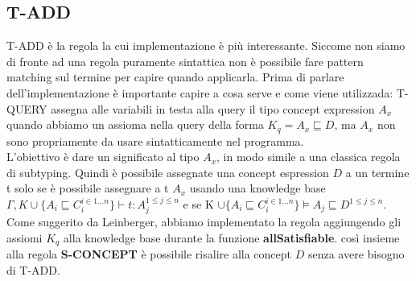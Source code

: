             \subsection{T-ADD}
            T-ADD è la regola la cui implementazione è più interessante. Siccome non siamo di fronte ad una regola puramente sintattica
            non è possibile fare pattern matching sul termine per capire quando applicarla.
            Prima di parlare dell'implementazione è importante capire a cosa serve e come viene utilizzada: T-QUERY assegna alle variabili in testa alla query
            il tipo concept expression $A_x$ quando abbiamo un assioma nella query della forma $K_q = A_x \sqsubseteq D$, ma $A_x$ non sono propriamente da usare sintatticamente nel programma.
            \\L'obiettivo è dare un significato al tipo $A_x$, in modo simile a una classica regola di subtyping. Quindi è possibile assegnate una concept espression $D$
            a un termine t solo se è possibile assegnare a t $A_x$ usando una knowledge base $\Gamma,K \cup \{A_i \sqsubseteq C_i^{i \in 1...n}\} \vdash t : A_j^{1 \leq j \leq n}$
            e se K $\cup \{A_i \sqsubseteq C_i^{i \in 1...n}\} \vDash A_j \sqsubseteq D^{1 \leq j \leq n}$.
            \\Come suggerito da Leinberger, abbiamo implementato la regola aggiungendo gli assiomi $K_q$ alla knowledge base durante la funzione \textbf{allSatisfiable}.
            così insieme alla regola \textbf{S-CONCEPT} è possibile risalire alla concept $D$ senza avere bisogno di T-ADD.
